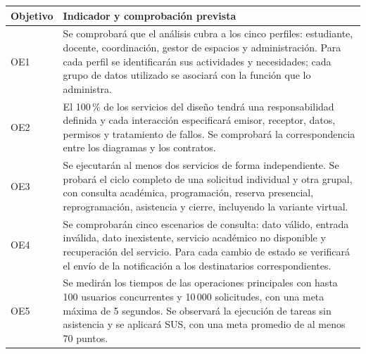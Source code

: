 \begin{longtable}{@{}p{}>{\raggedright\arraybackslash}p{}@{}}
\toprule
\textbf{Objetivo} & \textbf{Indicador y comprobación prevista}\\
\midrule
\endhead
OE1 & Se comprobará que el análisis cubra a los cinco perfiles: estudiante, docente, coordinación, gestor de espacios y administración. Para cada perfil se identificarán sus actividades y necesidades; cada grupo de datos utilizado se asociará con la función que lo administra.\\[0.15cm]
OE2 & El 100\,\% de los servicios del diseño tendrá una responsabilidad definida y cada interacción especificará emisor, receptor, datos, permisos y tratamiento de fallos. Se comprobará la correspondencia entre los diagramas y los contratos.\\[0.15cm]
OE3 & Se ejecutarán al menos dos servicios de forma independiente. Se probará el ciclo completo de una solicitud individual y otra grupal, con consulta académica, programación, reserva presencial, reprogramación, asistencia y cierre, incluyendo la variante virtual.\\[0.15cm]
OE4 & Se comprobarán cinco escenarios de consulta: dato válido, entrada inválida, dato inexistente, servicio académico no disponible y recuperación del servicio. Para cada cambio de estado se verificará el envío de la notificación a los destinatarios correspondientes.\\[0.15cm]
OE5 & Se medirán los tiempos de las operaciones principales con hasta 100 usuarios concurrentes y 10\,000 solicitudes, con una meta máxima de 5 segundos. Se observará la ejecución de tareas sin asistencia y se aplicará SUS, con una meta promedio de al menos 70 puntos.\\
\bottomrule
\end{longtable}
